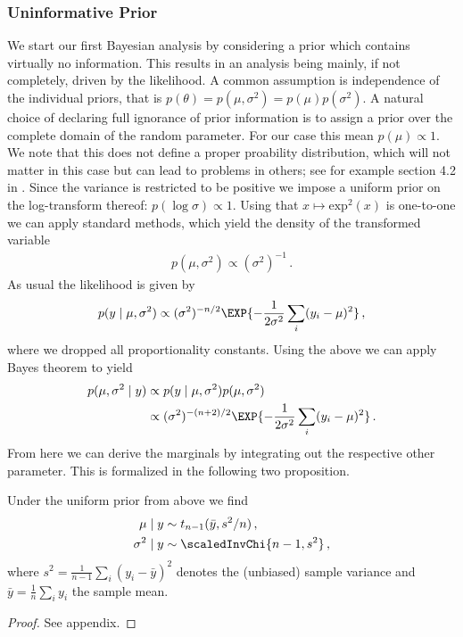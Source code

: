 \subsubsection*{Uninformative Prior}
We start our first Bayesian analysis by considering a prior which contains virtually no information.
This results in an analysis being mainly, if not completely, driven by the likelihood.
A common assumption is independence of the individual priors, that is $p(\theta) = p(\mu, \sigma^2) = p(\mu) p(\sigma^2)$.
A natural choice of declaring full ignorance of prior information is to assign a prior over the complete domain of the random parameter. For our case this mean $p(\mu) \propto 1$.
We note that this does not define a proper proability distribution, which will not matter in this case but can lead to problems in others; see for example section 4.2 in \citet{kass1996}.
Since the variance is restricted to be positive we impose a uniform prior on the log-transform thereof: $p(\log \sigma) \propto 1$.
Using that $x \mapsto \text{exp}^2(x)$ is one-to-one we can apply standard methods, which yield the density of the transformed variable
\begin{align}
  p(\mu, \sigma^2) \propto (\sigma^2)^{-1} \,.
\end{align}
As usual the likelihood is given by
\begin{align}
  p(y \mid \mu, \sigma^2) \propto (\sigma^2)^{-n/2} \EXP{-\frac{1}{2\sigma^2}\sum_i (y_i - \mu)^2} \,,
\end{align}
where we dropped all proportionality constants.
Using the above we can apply Bayes theorem to yield
\begin{align}
  p(\mu, \sigma^2 \mid y) &\propto p(y \mid \mu, \sigma^2) p(\mu, \sigma^2)\\
  &\propto (\sigma^2)^{-(n+2)/2} \EXP{-\frac{1}{2\sigma^2}\sum_i (y_i - \mu)^2} \,.
\end{align}
From here we can derive the marginals by integrating out the respective other parameter. This is formalized in the following two proposition.

\begin{proposition}\label{prop:posterior_uniform}
  Under the uniform prior from above we find
  \begin{align}
    \mu \mid y &\sim t_{n-1}(\bar{y}, s^2/n) \,,\\
    \sigma^2 \mid y &\sim \scaledInvChi{n-1, s^2} \,,
  \end{align}
  where $s^2 = \frac{1}{n-1} \sum_i (y_i - \bar{y})^2$ denotes the (unbiased) sample variance and $\bar{y} = \frac{1}{n} \sum_i y_i$ the sample mean.
\end{proposition}
\begin{proof}
See appendix.
\end{proof}

